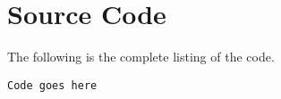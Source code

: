 \section{Source Code}
The following is the complete listing of the code.
\begin{tiny}
\begin{verbatim}
Code goes here
\end{verbatim}
\end{tiny}
